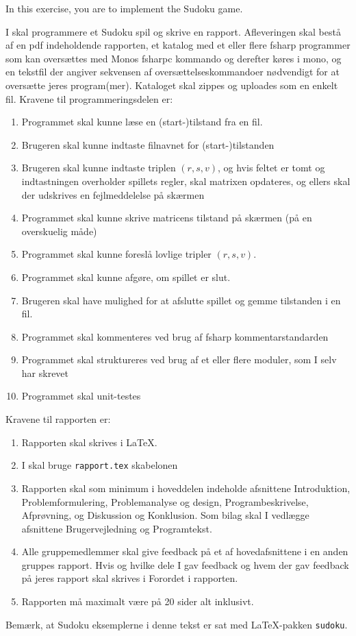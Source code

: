 In this exercise, you are to implement the Sudoku game. 



I skal programmere et Sudoku spil og skrive en rapport. Afleveringen skal bestå af en pdf indeholdende rapporten, et katalog med et eller flere fsharp programmer som kan oversættes med Monos fsharpc kommando og derefter køres i mono, og en tekstfil der angiver sekvensen af oversættelseskommandoer nødvendigt for at oversætte jeres program(mer). Kataloget skal zippes og uploades som en enkelt fil. Kravene til programmeringsdelen er:
\begin{enumerate}
\item Programmet skal kunne læse en (start-)tilstand fra en fil.
\item Brugeren skal kunne indtaste filnavnet for (start-)tilstanden
\item Brugeren skal kunne indtaste triplen $(r,s,v)$, og hvis feltet er tomt og indtastningen overholder spillets regler, skal matrixen opdateres, og ellers skal der udskrives en fejlmeddelelse på skærmen
\item Programmet skal kunne skrive matricens tilstand på skærmen (på en overskuelig måde)
\item Programmet skal kunne foreslå lovlige tripler $(r,s,v)$.
\item Programmet skal kunne afgøre, om spillet er slut.
\item Brugeren skal have mulighed for at afslutte spillet og gemme tilstanden i en fil.
\item Programmet skal kommenteres ved brug af fsharp kommentarstandarden
\item Programmet skal struktureres ved brug af et eller flere moduler, som I selv har skrevet
\item Programmet skal unit-testes
\end{enumerate}
Kravene til rapporten er:
\begin{enumerate}[resume]
\item Rapporten skal skrives i \LaTeX.
\item I skal bruge \texttt{rapport.tex} skabelonen
\item Rapporten skal som minimum i hoveddelen indeholde afsnittene Introduktion, Problemformulering, Problemanalyse og design, Programbeskrivelse, Afprøvning, og Diskussion og Konklusion. Som bilag skal I vedlægge afsnittene Brugervejledning og Programtekst.
\item Alle gruppemedlemmer skal give feedback på et af hovedafsnittene i en anden gruppes rapport. Hvis og hvilke dele I gav feedback og hvem der gav feedback på jeres rapport skal skrives i Forordet i rapporten.
\item Rapporten må maximalt være på 20 sider alt inklusivt.
\end{enumerate}
Bemærk, at Sudoku eksemplerne i denne tekst er sat med \LaTeX-pakken \texttt{sudoku}.
